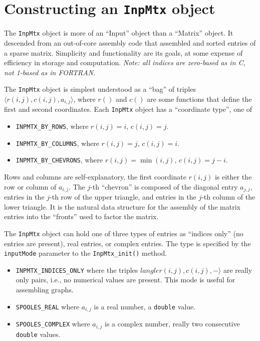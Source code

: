 \section{Constructing an {\tt InpMtx} object}
\label{subsection:construct-InpMtx}
\par
The {\tt InpMtx} object is more of an ``Input'' object 
than a ``Matrix'' object.
It descended from an out-of-core assembly code that assembled and
sorted entries of a sparse matrix.
Simplicity and functionality are its goals, at some expense of 
efficiency in storage and computation.
{\it Note: all indices are zero-based as in C, not 1-based as in
FORTRAN.}
\par
The {\tt InpMtx} object is simplest understood as a ``bag'' of
triples $\langle r(i,j),c(i,j),a_{i,j}\rangle$, 
where $r()$ and $c()$ are some
functions that define the first and second coordinates.
Each {\tt InpMtx} object has a ``coordinate type'', one of
\begin{itemize}
\item
{\tt INPMTX\_BY\_ROWS}, where $r(i,j) = i$, $c(i,j) = j$.
\item
{\tt INPMTX\_BY\_COLUMNS}, where $r(i,j) = j$, $c(i,j) = i$.
\item
{\tt INPMTX\_BY\_CHEVRONS}, 
where $r(i,j) = \min(i,j)$, $c(i,j) = j - i$.
\end{itemize}
Rows and columns are self-explanatory, the first coordinate
$r(i,j)$ is either the row or column of $a_{i,j}$.
The $j$-th ``chevron'' is composed of the diagonal entry $a_{j,j}$,
entries in the $j$-th row of the upper triangle,
and entries in the $j$-th column of the lower triangle.
It is the natural data structure for the assembly of the matrix
entries into the ``fronts'' used to factor the matrix.
\par
The {\tt InpMtx} object can hold one of three types of entries as
``indices only'' (no entries are present),
real entries, or complex entries.
The type is specified by the {\tt inputMode}
parameter to the {\tt InpMtx\_init()} method.
\begin{itemize}
\item
{\tt INPMTX\_INDICES\_ONLY} where the triples
$langle r(i,j),c(i,j),-\rangle$ are really only pairs,
i.e., no numerical values are present.
This mode is useful for assembling graphs.
\item
{\tt SPOOLES\_REAL} where $a_{i,j}$ is a real number,
a {\tt double} value.
\item
{\tt SPOOLES\_COMPLEX} where $a_{i,j}$ is a complex number,
really two consecutive {\tt double} values.
\end{itemize}
